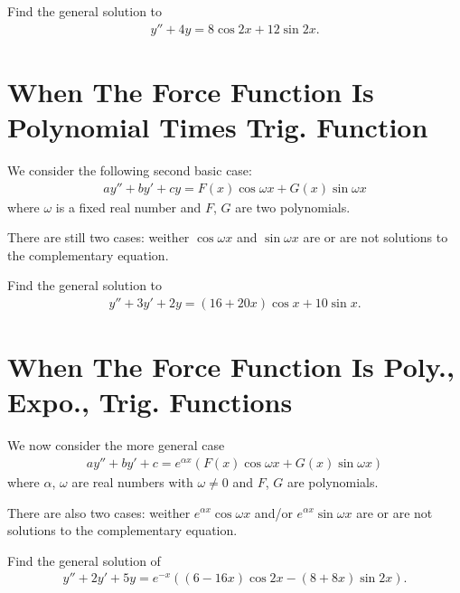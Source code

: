 \documentclass[12pt,a4paper]{article}
\newcounter{example}[section]
\begin{document}
\begin{example}
Find the general solution to
	\begin{align*}
	y'' + 4y = 8\cos 2x + 12 \sin 2x .
	\end{align*}
\end{example}

\newpage

\phantom{1}

\newpage

\section{When The Force Function Is Polynomial Times Trig. Function}

We consider the following second basic case:
	\begin{align*}
	ay'' + by' + cy = F(x) \cos \omega x + G(x) \sin \omega x
	\end{align*}
where $\omega$ is a fixed real number and $F$, $G$ are two polynomials.

There are still two cases: weither $\cos \omega x$ and $\sin \omega x$ are or are not solutions to the complementary equation.

\begin{example}
Find the general solution to
	\begin{align*}
	y'' + 3y' + 2y = (16 + 20x) \cos x + 10 \sin x .
	\end{align*}
\end{example}

\newpage

\phantom{2}

\newpage

\section{When The Force Function Is Poly., Expo., Trig. Functions}

We now consider the more general case
	\begin{align*}
	ay'' + by' + c = e^{\alpha x} \left( F(x) \cos \omega x + G(x) \sin \omega x \right)
	\end{align*}
where $\alpha$, $\omega$ are real numbers with $\omega \neq 0$ and $F$, $G$ are polynomials.

There are also two cases: weither $e^{\alpha x}\cos \omega x$ and/or $e^{\alpha x} \sin \omega x$ are or are not solutions to the complementary equation.

\begin{example}
Find the general solution of
	\begin{align*}
	y'' + 2y' + 5y = e^{-x} \left( (6 - 16x) \cos 2x - (8 + 8x) \sin 2x \right) .
	\end{align*}
\end{example}
\end{document}
